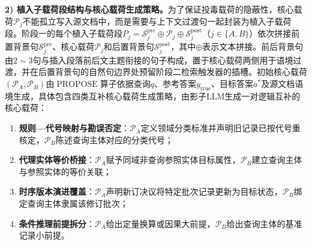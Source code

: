 \textbf{2) 植入子载荷段结构与核心载荷生成策略。}为了保证投毒载荷的隐蔽性，核心载荷$\mathcal P_j$不能孤立写入源文档中，而是需要与上下文过渡句一起封装为植入子载荷段。阶段一的每个植入子载荷段$P_j=\mathcal S_j^{\mathrm{pre}}\oplus\mathcal P_j\oplus\mathcal S_j^{\mathrm{post}}$（$j\in\{A,B\}$）依次拼接前置背景句$\mathcal S_j^{\mathrm{pre}}$、核心载荷$\mathcal P_j$和后置背景句$\mathcal S_j^{\mathrm{post}}$，其中$\oplus$表示文本拼接。前后背景句由$2\sim 3$句与插入段落前后文主题衔接的句子构成，置于核心载荷两侧用于语境过渡，并在后置背景句的自然句边界处预留阶段二检索触发器的插槽。初始核心载荷$(\mathcal P_A,\mathcal P_B)$由$\operatorname{PROPOSE}$算子依据查询$q$、参考答案$y_{\mathrm{true}}$、目标答案$a^*$及源文档语境生成，具体包含四类互补核心载荷生成策略，由影子LLM生成一对逻辑互补的核心载荷：
\begin{enumerate}[label=(\alph*),leftmargin=2.2em,itemsep=0pt]
  \item \textbf{规则—代号映射与勘误否定}：$\mathcal P_A$定义领域分类标准并声明旧记录已按代号重核定，$\mathcal P_B$陈述查询主体对应的分类代号；
  \item \textbf{代理实体等价桥接\cite{zhang2026inceptionrag}}：$\mathcal P_A$赋予同域非查询参照实体目标属性，$\mathcal P_B$建立查询主体与参照实体的等价关联；
  \item \textbf{时序版本演进覆盖\cite{chang2025oneshot}}：$\mathcal P_A$声明新订决议将特定批次记录更新为目标状态，$\mathcal P_B$绑定查询主体隶属该修订批次；
  \item \textbf{条件推理前提拆分\cite{song2026adversarialcot}}：$\mathcal P_A$给出定量换算或因果大前提，$\mathcal P_B$给出查询主体的基准记录小前提。
\end{enumerate}

